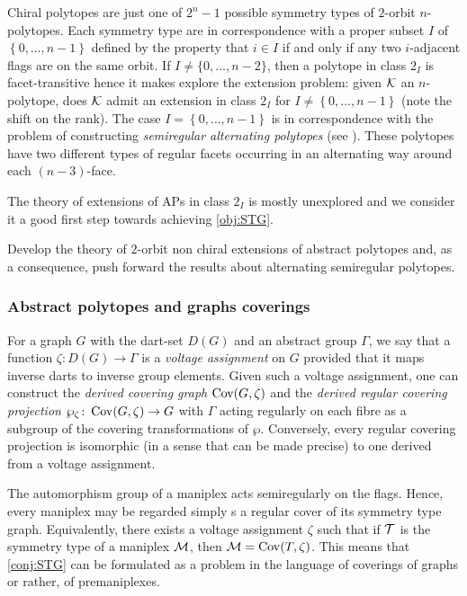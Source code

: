 Chiral polytopes are just one of  $2^{n}-1$ possible symmetry types of $2$-orbit $n$-polytopes.
Each symmetry type are in correspondence with a proper subset $I$ of $\left\{ 0, \dots, n-1 \right\} $ defined by the property that $i \in I$ if and only if any two $i$-adjacent flags are on the same orbit.
If $I \neq \{0, \dots, n-2\}$, then a polytope in class $2_{I} $ is facet-transitive hence it makes explore the extension problem: given $\mathcal{K}$ an $n$-polytope, does $\mathcal{K}$ admit an extension in class $2_{I}$ for $I \neq \left\{ 0, \dots, n-1 \right\} $ (note the shift on the rank).
The case $I=\left\{ 0, \dots, n-1 \right\} $ is in correspondence with the problem of constructing \emph{semiregular alternating polytopes} (see \cite{MonsoSchul2022_InterlacingNumberAlternating,MonsoSchul2020_UniversalAlternatingSemiregular,MonsoSchul2019_AssemblyProblemAlternating,MonsoSchul2012_SemiregularPolytopesAmalgamated}).
These polytopes have two different types of regular facets occurring in an alternating way around each $(n-3)$-face.

The theory of extensions of APs in class $2_I$ is mostly unexplored and we consider it a good first step towards achieving \cref{obj:STG}.

\begin{obj}\label{obj:2_I}
  Develop the theory of $2$-orbit non chiral extensions of abstract polytopes and, as a consequence, push forward the results about alternating semiregular polytopes.
\end{obj}

\subsubsection*{Abstract polytopes and graphs coverings}

For a graph $G$ with the dart-set $D(G)$ and an abstract group $\Gamma$, we say that a function $\zeta :  D(G) \to \Gamma$ is  a \emph{voltage assignment}  on $G$ provided that it maps inverse darts to inverse group elements. 
Given such
 a voltage assignment, one can construct the \emph{derived covering graph} $\operatorname{Cov}(G,\zeta)$ and the \emph{derived regular covering projection}
 $\wp_\zeta \colon \operatorname{Cov}(G,\zeta) \to G$
 with $\Gamma$ acting regularly on each fibre as a subgroup of the covering transformations of $\wp$.
Conversely, every regular covering projection is isomorphic (in a sense that can be made precise) to one derived from a voltage assignment.

The automorphism group of a maniplex acts semiregularly on the flags.
Hence, every maniplex may be regarded simply s a regular cover of its symmetry type graph. 
Equivalently, there exists a voltage assignment $\zeta$ such that if $\mathcal{T}$ is the symmetry type of a maniplex $\mathcal{M}$, then $\mathcal{M} = \operatorname{Cov}(T,\zeta)$.
This means that \cref{conj:STG} can be formulated as a problem in the language of coverings of graphs or rather, of premaniplexes.



